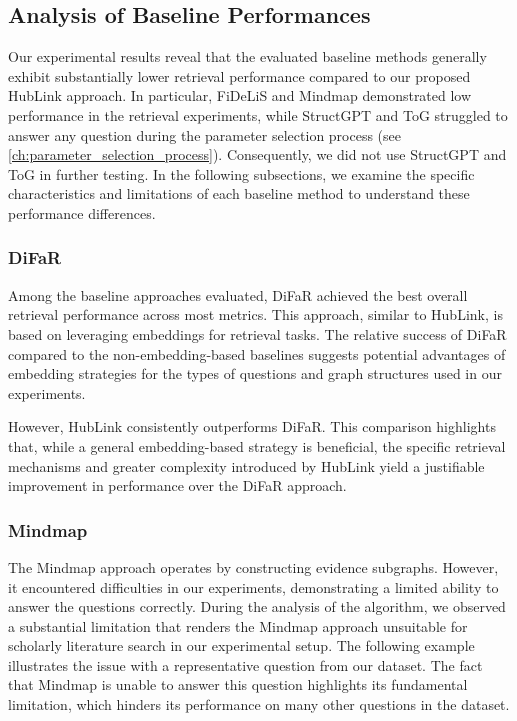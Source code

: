 \subsection{Analysis of Baseline Performances}

Our experimental results reveal that the evaluated baseline methods generally exhibit substantially lower retrieval performance compared to our proposed HubLink approach. In particular, FiDeLiS and Mindmap demonstrated low performance in the retrieval experiments, while StructGPT and ToG struggled to answer any question during the parameter selection process (see \autoref{ch:parameter_selection_process}). Consequently, we did not use StructGPT and ToG in further testing. In the following subsections, we examine the specific characteristics and limitations of each baseline method to understand these performance differences.

\subsubsection{DiFaR}

Among the baseline approaches evaluated, DiFaR \cite{baek_direct_2023} achieved the best overall retrieval performance across most metrics. This approach, similar to HubLink, is based on leveraging embeddings for retrieval tasks. The relative success of DiFaR compared to the non-embedding-based baselines suggests potential advantages of embedding strategies for the types of questions and graph structures used in our experiments.

However, HubLink consistently outperforms DiFaR. This comparison highlights that, while a general embedding-based strategy is beneficial, the specific retrieval mechanisms and greater complexity introduced by HubLink yield a justifiable improvement in performance over the DiFaR approach. 

\subsubsection{Mindmap}

The Mindmap approach \cite{wen_mindmap_2024} operates by constructing evidence subgraphs. However, it encountered difficulties in our experiments, demonstrating a limited ability to answer the questions correctly. During the analysis of the algorithm, we observed a substantial limitation that renders the Mindmap approach unsuitable for scholarly literature search in our experimental setup. The following example illustrates the issue with a representative question from our dataset. The fact that Mindmap is unable to answer this question highlights its fundamental limitation, which hinders its performance on many other questions in the dataset.

